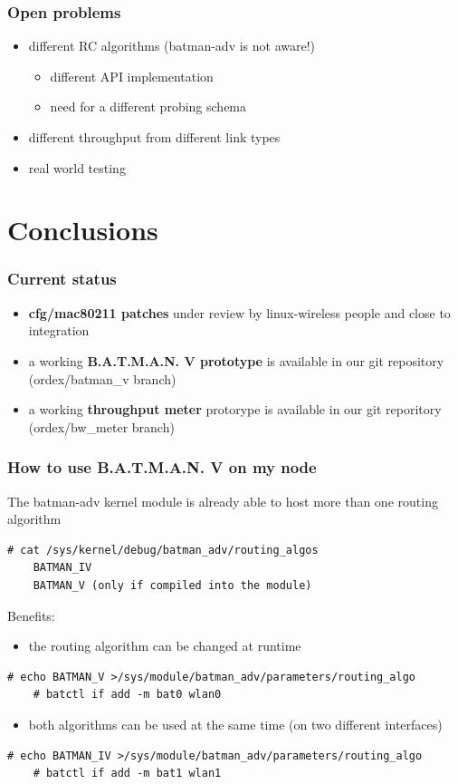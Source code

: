 \documentclass[slidestop]{beamer}
\begin{document}
\begin{frame}[c]
	\frametitle{Open problems}
	\begin{itemize}
		\item different RC algorithms (batman-adv is not aware!)
		\begin{itemize}
			\item different API implementation
			\item need for a different probing schema
		\end{itemize}
		\item different throughput from different link types
		\item real world testing
	\end{itemize}
\end{frame}

\section{Conclusions}
\begin{frame}[c]
	\frametitle{Current status}
	\begin{itemize}
		\item \textbf{cfg/mac80211 patches} under review by linux-wireless people
			and close to integration
		\item a working \textbf{B.A.T.M.A.N. V prototype} is available in our git
			repository (ordex/batman\_v branch)
		\item a working \textbf{throughput meter} protorype is available
			in our git reporitory (ordex/bw\_meter branch)
	\end{itemize}
\end{frame}

\begin{frame}[c,fragile]
	\frametitle{How to use B.A.T.M.A.N. V on my node}
	The batman-adv kernel module is already able to host more than one
	routing algorithm
	\begin{lstlisting}[basicstyle=\scriptsize]
	# cat /sys/kernel/debug/batman_adv/routing_algos
	BATMAN_IV
	BATMAN_V (only if compiled into the module)
	\end{lstlisting}
	\pause
	Benefits:
	\begin{itemize}
		\item the routing algorithm can be changed at runtime
	\end{itemize}
	\begin{lstlisting}[basicstyle=\scriptsize]
	# echo BATMAN_V >/sys/module/batman_adv/parameters/routing_algo
	# batctl if add -m bat0 wlan0
	\end{lstlisting}
	\pause
	\begin{itemize}
		\item both algorithms can be used at the same time (on two
			different interfaces)
	\end{itemize}
	\begin{lstlisting}[basicstyle=\scriptsize]
	# echo BATMAN_IV >/sys/module/batman_adv/parameters/routing_algo
	# batctl if add -m bat1 wlan1
	\end{lstlisting}
\end{frame}
\end{document}
